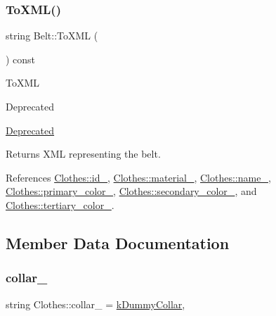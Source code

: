 \mbox{\label{classBelt_a69b84739e63f35afa5dacf6f3ce0d731}} 
\subsubsection{\texorpdfstring{To\+X\+M\+L()}{ToXML()}}
{\footnotesize\ttfamily string Belt\+::\+To\+X\+ML (\begin{DoxyParamCaption}{ }\end{DoxyParamCaption}) const}

To\+X\+ML \begin{DoxyRefDesc}{Deprecated}
\item[\mbox{\hyperlink{deprecated__deprecated000001}{Deprecated}}]\end{DoxyRefDesc}
\begin{DoxyReturn}{Returns}
X\+ML representing the belt. 
\end{DoxyReturn}


References \mbox{\hyperlink{classClothes_a8978d931db5ca47c3ccea30def4ae83e}{Clothes\+::id\+\_\+}}, \mbox{\hyperlink{classClothes_adbb9ed311f14ccbb1e4fe0e8378a95d4}{Clothes\+::material\+\_\+}}, \mbox{\hyperlink{classClothes_a7f2275aaae24224d60c48af922c31b65}{Clothes\+::name\+\_\+}}, \mbox{\hyperlink{classClothes_a7cb005bf6cbb7f4eaa40f1b31817559c}{Clothes\+::primary\+\_\+color\+\_\+}}, \mbox{\hyperlink{classClothes_ab8f55f67b956b25d71260cffcf273673}{Clothes\+::secondary\+\_\+color\+\_\+}}, and \mbox{\hyperlink{classClothes_a3c5f1e7ab531e3ba7a38b930da8078a0}{Clothes\+::tertiary\+\_\+color\+\_\+}}.



\subsection{Member Data Documentation}
\mbox{\label{classClothes_ae2e5026257b3a2f2ddbf61757fd3b57b}} 
\subsubsection{\texorpdfstring{collar\+\_\+}{collar\_}}
{\footnotesize\ttfamily string Clothes\+::collar\+\_\+ = \mbox{\hyperlink{clothes_8h_ac06c9f556f68bcd2829e36c55b70a86e}{k\+Dummy\+Collar}}\hspace{0.3cm}{\ttfamily [protected]}, {\ttfamily [inherited]}}




